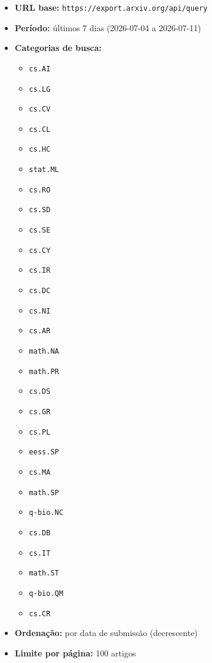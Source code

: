 \documentclass[
  brazilian,
  11pt,
  letterpaper,
  DIV=11,
  numbers=noendperiod]{scrartcl}
\providecommand{\tightlist}{%
  \setlength{\itemsep}{0pt}\setlength{\parskip}{0pt}}
\begin{document}
\begin{itemize}
\tightlist
\item
  \textbf{URL base:} \texttt{https://export.arxiv.org/api/query}
\item
  \textbf{Período:} últimos 7 dias (2026-07-04 a 2026-07-11)
\item
  \textbf{Categorias de busca:}

  \begin{itemize}
  \tightlist
  \item
    \texttt{cs.AI}
  \item
    \texttt{cs.LG}
  \item
    \texttt{cs.CV}
  \item
    \texttt{cs.CL}
  \item
    \texttt{cs.HC}
  \item
    \texttt{stat.ML}
  \item
    \texttt{cs.RO}
  \item
    \texttt{cs.SD}
  \item
    \texttt{cs.SE}
  \item
    \texttt{cs.CY}
  \item
    \texttt{cs.IR}
  \item
    \texttt{cs.DC}
  \item
    \texttt{cs.NI}
  \item
    \texttt{cs.AR}
  \item
    \texttt{math.NA}
  \item
    \texttt{math.PR}
  \item
    \texttt{cs.DS}
  \item
    \texttt{cs.GR}
  \item
    \texttt{cs.PL}
  \item
    \texttt{eess.SP}
  \item
    \texttt{cs.MA}
  \item
    \texttt{math.SP}
  \item
    \texttt{q-bio.NC}
  \item
    \texttt{cs.DB}
  \item
    \texttt{cs.IT}
  \item
    \texttt{math.ST}
  \item
    \texttt{q-bio.QM}
  \item
    \texttt{cs.CR}
  \end{itemize}
\item
  \textbf{Ordenação:} por data de submissão (decrescente)
\item
  \textbf{Limite por página:} 100 artigos
\end{itemize}
\end{document}
